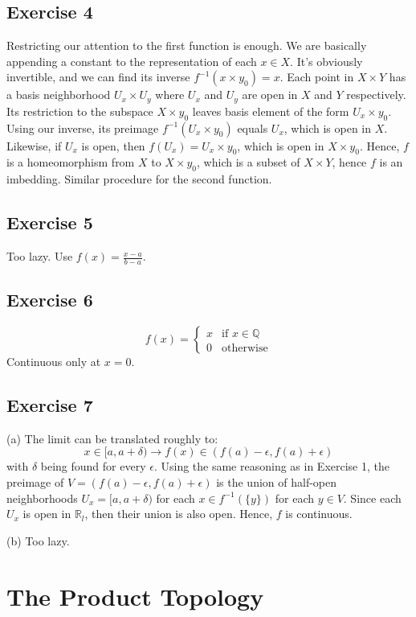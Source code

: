\documentclass{book}
\begin{document}
\subsection*{Exercise 4}
Restricting our attention to the first function is enough. We are basically appending a constant to the representation of each $x \in X$. It's obviously invertible, and we can find its inverse $f^{-1}(x \times y_0) = x$. Each point in $X \times Y$ has a basis neighborhood $U_x \times U_y$ where $U_x$ and $U_y$ are open in $X$ and $Y$ respectively. Its restriction to the subspace $X \times y_0$ leaves basis element of the form $U_x \times y_0$. Using our inverse, its preimage $f^{-1}(U_x \times y_0)$ equals $U_x$, which is open in $X$. Likewise, if $U_x$ is open, then $f(U_x) = U_x \times y_0$, which is open in $X \times y_0$. Hence, $f$ is a homeomorphism from $X$ to $X \times y_0$, which is a subset of $X \times Y$, hence $f$ is an imbedding. Similar procedure for the second function.

\subsection*{Exercise 5}
Too lazy. Use $f(x) = \frac{x - a}{b - a}$.

\subsection*{Exercise 6}
$$f(x) = \begin{cases}
    x & \text{if } x \in \mathbb{Q} \\
    0 & \text{otherwise}
\end{cases}$$
Continuous only at $x = 0$.

\subsection*{Exercise 7}
(a)
The limit can be translated roughly to:
$$x \in [a, a + \delta) \rightarrow f(x) \in (f(a) - \epsilon, f(a) + \epsilon)$$
with $\delta$ being found for every $\epsilon$. Using the same reasoning as in Exercise 1, the preimage of $V = (f(a) - \epsilon, f(a) + \epsilon)$ is the union of half-open neighborhoods $U_x = [a, a + \delta)$ for each $x \in f^{-1}(\{ y \})$ for each $y \in V$. Since each $U_x$ is open in $\mathbb{R}_l$, then their union is also open. Hence, $f$ is continuous.

\noindent
(b)
Too lazy.

\section{The Product Topology}
\end{document}
